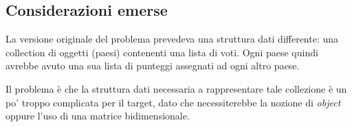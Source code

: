 \documentclass[a4paper]{article}
\begin{document}
\subsection{Considerazioni emerse}
La versione originale del problema prevedeva una struttura dati differente: una collection di oggetti (paesi) contenenti una lista di voti.
Ogni paese quindi avrebbe avuto una sua lista di punteggi assegnati ad ogni altro paese.

Il problema è che la struttura dati necessaria a rappresentare tale collezione è un po' troppo complicata per il target, dato che necessiterebbe la nozione di \textit{object} oppure l'uso di una matrice bidimensionale.

\printbibliography
\end{document}
